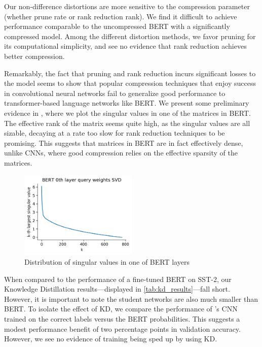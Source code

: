 \documentclass[10pt]{article}
\begin{document}
Our non-difference distortions are more sensitive to the compression parameter
(whether prune rate or rank reduction rank). We find it difficult to achieve performance
comparable to the uncompressed BERT with a significantly compressed model. Among
the different distortion methods, we favor pruning for its computational
simplicity, and see no evidence that rank reduction achieves better compression.

Remarkably, the fact that pruning and rank reduction incurs significant
losses to the
model seems to show that popular compression techniques that enjoy success
in convolutional neural networks fail to generalize good performance to
transformer-based language networks like BERT. We present some preliminary
evidence in , where we plot the singular values
in one of the matrices in BERT. The effective rank of the matrix seems
quite high, as the singular values are all sizable, decaying at a rate too
slow for rank reduction techniques to be promising. This suggests that
matrices in BERT are in fact effectively dense, unlike CNNs, where
good compression relies on the effective sparsity of the matrices. 
\begin{figure}[tb]
    \centering
    \includegraphics[width=0.5\textwidth]
    {../figs/svd-singular-vals-distribution.png}
    \caption{Distribution of singular values in one of BERT layers}
    \label{fig:singular-values}
\end{figure}

When compared to the performance of a fine-tuned BERT on SST-2, our Knowledge
Distillation results---displayed in \cref{tab:kd_results}---fall short. However,
it is important to note the student networks are also much smaller than BERT. To
isolate the effect of KD, we compare the performance of
\citet{kim2014convolutional}'s CNN trained on the correct labels versus the BERT
probabilities. This suggests a modest performance benefit of two percentage
points in validation accuracy. However, we see no evidence of training being
sped up by using KD.
\end{document}
